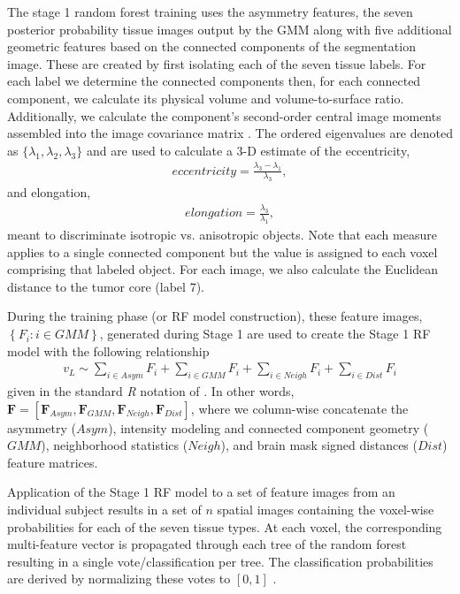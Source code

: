The stage 1 random forest training uses the asymmetry features, the seven posterior probability
tissue images output by the GMM
along with five additional geometric features based on the connected 
components of the segmentation image.  These are created by first isolating
each of the seven tissue labels.  For each label we determine the connected
components then, for each connected component, we calculate its physical
volume and volume-to-surface ratio. Additionally, we calculate the component's 
second-order central image moments assembled into the image covariance matrix 
\citep{padfield2008}.  
The ordered eigenvalues are denoted as $\{\lambda_1,\lambda_2,\lambda_3\}$ and 
are used to calculate a 3-D estimate of the eccentricity,
\begin{align}
  eccentricity = \frac{\lambda_3 - \lambda_1}{\lambda_3},
\end{align}
and elongation,
\begin{align}
  elongation = \frac{\lambda_3}{\lambda_1},
\end{align}
meant to discriminate isotropic vs. anisotropic objects.
Note that each measure applies to a single connected component but
the value is assigned to each voxel comprising that labeled object.
For each image, we also calculate the Euclidean distance
to the tumor core (label 7).  

During the training phase (or RF model construction),
these feature images, $\left\{F_i: i \in GMM\right\}$, generated during Stage 1 are used to create
the Stage 1 RF model with the following relationship
\begin{align}
\label{eq:gmm}
 v_L \sim \sum_{i \in Asym} F_i + \sum_{i \in GMM} F_i + \sum_{i \in Neigh} F_i + \sum_{i \in Dist} F_i
\end{align}
given in the standard \textit{R} notation of \cite{wilkinson1973}.  
In other words, $\bm{F}= [ \bm{F}_{Asym}, \bm{F}_{GMM},
\bm{F}_{Neigh}, \bm{F}_{Dist} ]$, where we column-wise concatenate the asymmetry ($Asym$),
intensity modeling and connected component geometry ($GMM$), neighborhood statistics ($Neigh$),
 and brain mask signed distances ($Dist$) feature matrices.
 
Application of the Stage 1 RF model to a set of feature images 
from an individual subject results in a set of $n$ spatial images
containing the voxel-wise probabilities for each 
of the seven tissue types.  At each voxel, the corresponding multi-feature 
vector is propagated through each tree of the random forest 
resulting in a single vote/classification per tree.  The
classification probabilities are derived by normalizing 
these votes to $[0,1]$ \citep{liaw2002}. 
 
